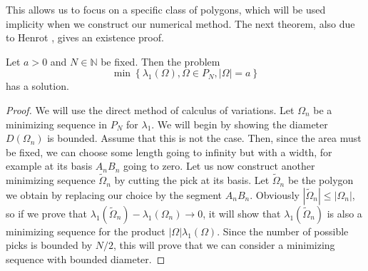 This allows us to focus on a specific class of polygons, which will be used implicity when we construct our numerical method.
The next theorem, also due to Henrot \cite{henrot}, gives an existence proof.
\begin{theorem}
  Let $a > 0$ and $N \in \mathbb{N}$ be fixed.
  Then the problem
  \[
    \min \left\{ \lambda_{1}(\Omega), \Omega \in P_{N}, |\Omega| = a \right\} 
  \] 
  has a solution.
\end{theorem}
\begin{proof}
  We will use the direct method of calculus of variations.
  Let $\Omega_{n}$ be a minimizing sequence in $P_{N}$ for $\lambda_1$.
  We will begin by showing the diameter $D(\Omega_{n})$ is bounded.
  Assume that this is not the case.
  Then, since the area must be fixed, we can choose some length going to infinity but with a width, for example at its basis $A_{n}B_{n}$ going to zero.
  Let us now construct another minimizing sequence $\widetilde{\Omega}_{n}$ by cutting the pick at its basis.
  Let $\widetilde{\Omega}_{n}$ be the polygon we obtain by replacing our choice by the segment $A_{n}B_{n}$.
  Obviously $| \widetilde{\Omega}_{n} | \leq | \Omega_{n} | $, so if we prove that $\lambda_{1}(\widetilde{\Omega}_{n}) - \lambda_{1}(\Omega_{n}) \to 0$, it will show that $\lambda_{1}(\widetilde{\Omega}_{n})$ is also a minimizing sequence for the product $| \Omega | \lambda_{1}(\Omega)$.
  Since the number of possible picks is bounded by $N / 2$, this will prove that we can consider a minimizing sequence with bounded diameter.


\end{proof}
